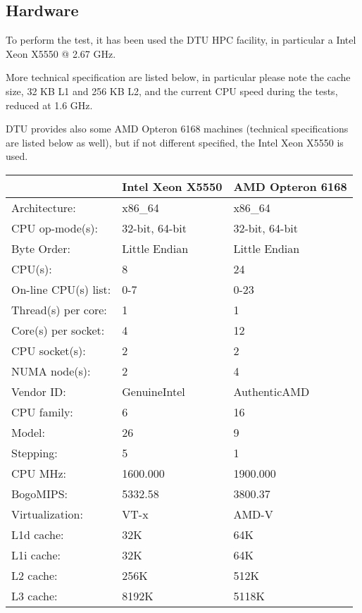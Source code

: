 \subsection{Hardware} 
 
To perform the test, it has been used the DTU HPC facility, in particular a Intel Xeon X5550 @ 2.67 GHz.

More technical specification are listed below, in particular please note the cache size, 32 KB L1 and 256 KB L2, and the current CPU speed during the tests, reduced at 1.6 GHz.

DTU provides also some AMD Opteron 6168 machines (technical specifications are listed below as well), but if not different specified, the Intel Xeon X5550 is used.

\vspace{0.5cm}
 
\begin{tabular}{ l l l }
\hline
 & Intel Xeon X5550 & AMD Opteron 6168 \\ \hline \hline
Architecture:          & x86\_64 & x86\_64\\ \hline
CPU op-mode(s):        & 32-bit, 64-bit & 32-bit, 64-bit\\ \hline
Byte Order:            & Little Endian & Little Endian\\ \hline
CPU(s):                & 8 & 24\\ \hline
On-line CPU(s) list:   & 0-7 & 0-23\\ \hline
Thread(s) per core:    & 1 & 1\\ \hline
Core(s) per socket:    & 4 & 12\\ \hline
CPU socket(s):         & 2 & 2\\ \hline
NUMA node(s):          & 2 & 4\\ \hline
Vendor ID:             & GenuineIntel & AuthenticAMD\\ \hline
CPU family:            & 6 & 16\\ \hline
Model:                 & 26 & 9\\ \hline
Stepping:              & 5 & 1\\ \hline
CPU MHz:               & 1600.000 & 1900.000\\ \hline
BogoMIPS:              & 5332.58 & 3800.37\\ \hline
Virtualization:        & VT-x & AMD-V\\ \hline
L1d cache:             & 32K & 64K\\ \hline
L1i cache:             & 32K & 64K\\ \hline
L2 cache:              & 256K & 512K\\ \hline
L3 cache:              & 8192K & 5118K\\ \hline
\end{tabular}


